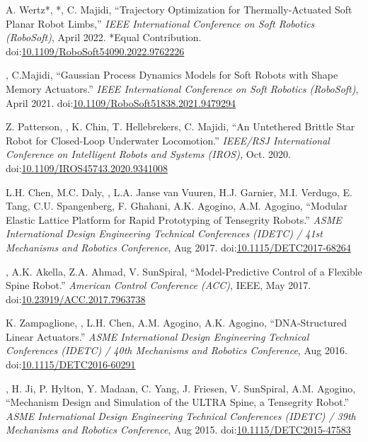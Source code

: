 \documentclass[letterpaper]{deedy-resume} %
\newcommand\doilink[1]{\href{http://dx.doi.org/#1}{#1}}
\newcommand\doi[1]{doi:\doilink{#1}}
\begin{document}
{\begin{etaremune}[itemsep=0.1cm]
\item A. Wertz*, \underline{{}}*, C. Majidi, ``Trajectory Optimization for Thermally-Actuated Soft Planar Robot Limbs,'' {\it IEEE International Conference on Soft Robotics (RoboSoft)}, April 2022. *Equal Contribution. \doi{10.1109/RoboSoft54090.2022.9762226}

\item \underline{{}}, C.Majidi, ``Gaussian Process Dynamics Models for Soft Robots with Shape Memory Actuators.'' {\it IEEE International Conference on Soft Robotics (RoboSoft)}, April 2021.  \doi{10.1109/RoboSoft51838.2021.9479294}

\item Z. Patterson, \underline{{}}, K. Chin, T. Hellebrekers, C. Majidi, ``An Untethered Brittle Star Robot for Closed-Loop Underwater Locomotion.'' {\it IEEE/RSJ International Conference on Intelligent Robots and Systems (IROS),} Oct. 2020. \doi{10.1109/IROS45743.2020.9341008}

\item L.H. Chen, M.C. Daly, \underline{{}}, L.A. Janse van Vuuren, H.J. Garnier, M.I. Verdugo, E. Tang, C.U. Spangenberg, F. Ghahani, A.K. Agogino, A.M. Agogino, ``Modular Elastic Lattice Platform for Rapid Prototyping of Tensegrity Robots.'' {\it  ASME International Design Engineering Technical Conferences (IDETC) / 41st Mechanisms and Robotics Conference}, Aug 2017. \doi{10.1115/DETC2017-68264}

\item \underline{{}}, A.K. Akella, Z.A. Ahmad, V. SunSpiral, ``Model-Predictive Control of a Flexible Spine Robot.'' {\it American Control Conference (ACC)}, IEEE, May 2017. \doi{10.23919/ACC.2017.7963738}

\item K. Zampaglione, \underline{{}}, L.H. Chen, A.M. Agogino,  A.K. Agogino, ``DNA-Structured Linear Actuators.'' {\it ASME International Design Engineering Technical Conferences (IDETC) / 40th Mechanisms and Robotics Conference}, Aug 2016. \doi{10.1115/DETC2016-60291}
  
\item \underline{{}}, H. Ji, P. Hylton, Y. Madaan, C. Yang, J. Friesen, V. SunSpiral, A.M. Agogino, ``Mechanism Design and Simulation of the ULTRA Spine, a Tensegrity Robot.'' {\it ASME International Design Engineering Technical Conferences (IDETC) / 39th Mechanisms and Robotics Conference}, Aug 2015. \doi{10.1115/DETC2015-47583}


\end{etaremune}}
\end{document}
